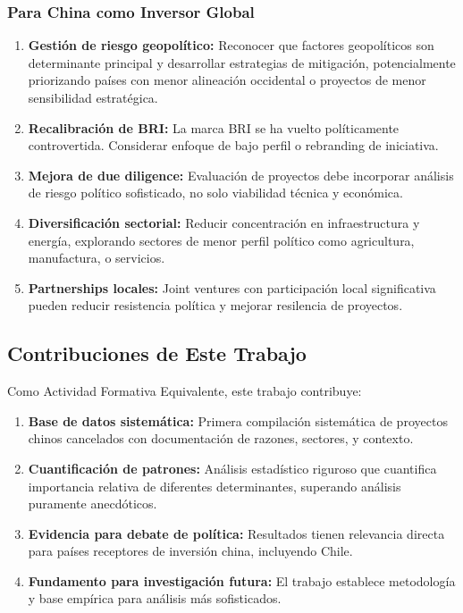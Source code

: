 \documentclass[12pt]{article}
\begin{document}
\subsubsection{Para China como Inversor Global}

\begin{enumerate}
    \item \textbf{Gestión de riesgo geopolítico:} Reconocer que factores geopolíticos son determinante principal y desarrollar estrategias de mitigación, potencialmente priorizando países con menor alineación occidental o proyectos de menor sensibilidad estratégica.
    
    \item \textbf{Recalibración de BRI:} La marca BRI se ha vuelto políticamente controvertida. Considerar enfoque de bajo perfil o rebranding de iniciativa.
    
    \item \textbf{Mejora de due diligence:} Evaluación de proyectos debe incorporar análisis de riesgo político sofisticado, no solo viabilidad técnica y económica.
    
    \item \textbf{Diversificación sectorial:} Reducir concentración en infraestructura y energía, explorando sectores de menor perfil político como agricultura, manufactura, o servicios.
    
    \item \textbf{Partnerships locales:} Joint ventures con participación local significativa pueden reducir resistencia política y mejorar resilencia de proyectos.
\end{enumerate}

\subsection{Contribuciones de Este Trabajo}

Como Actividad Formativa Equivalente, este trabajo contribuye:

\begin{enumerate}
    \item \textbf{Base de datos sistemática:} Primera compilación sistemática de proyectos chinos cancelados con documentación de razones, sectores, y contexto.
    
    \item \textbf{Cuantificación de patrones:} Análisis estadístico riguroso que cuantifica importancia relativa de diferentes determinantes, superando análisis puramente anecdóticos.
    
    \item \textbf{Evidencia para debate de política:} Resultados tienen relevancia directa para países receptores de inversión china, incluyendo Chile.
    
    \item \textbf{Fundamento para investigación futura:} El trabajo establece metodología y base empírica para análisis más sofisticados.
\end{enumerate}
\end{document}
